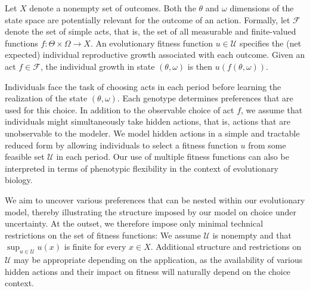\documentclass[12pt,a4paper]{article}
\newenvironment{original}
  {\par\noindent\color{black}\smallskip}
  {\par\smallskip}
\begin{document}
\begin{original}
Let $X$ denote a nonempty set of outcomes. Both the $\theta$ and $\omega$ dimensions of the state space are potentially relevant for the outcome of an action. Formally, let $\mathcal{F}$ denote the set of simple acts, that is, the set of all measurable and finite-valued functions $f \colon \Theta \times \Omega \to X$. An evolutionary fitness function $u \in \mathcal{U}$ specifies the (net expected) individual reproductive growth associated with each outcome. Given an act $f \in \mathcal{F}$, the individual growth in state $(\theta, \omega)$ is then $u(f(\theta, \omega))$.

Individuals face the task of choosing acts in each period before learning the realization of the state $(\theta, \omega)$. Each genotype determines preferences that are used for this choice. In addition to the observable choice of act $f$, we assume that individuals might simultaneously take hidden actions, that is, actions that are unobservable to the modeler. We model hidden actions in a simple and tractable reduced form by allowing individuals to select a fitness function $u$ from some feasible set $\mathcal{U}$ in each period. Our use of multiple fitness functions can also be interpreted in terms of phenotypic flexibility in the context of evolutionary biology.

We aim to uncover various preferences that can be nested within our evolutionary model, thereby illustrating the structure imposed by our model on choice under uncertainty. At the outset, we therefore impose only minimal technical restrictions on the set of fitness functions: We assume $\mathcal{U}$ is nonempty and that $\sup_{u \in \mathcal{U}} u(x)$ is finite for every $x \in X$. Additional structure and restrictions on $\mathcal{U}$ may be appropriate depending on the application, as the availability of various hidden actions and their impact on fitness will naturally depend on the choice context.
\end{original}
\end{document}
